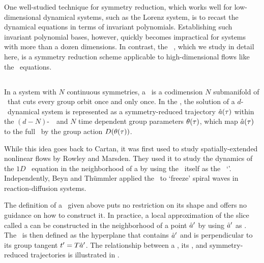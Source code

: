 \documentclass[aip,cha,
reprint,
secnumarabic,
nofootinbib, tightenlines,
nobibnotes, showkeys, showpacs,
superscriptaddress,
]{revtex4-1}
\begin{document}
One well-studied technique for symmetry reduction, which works well for low-dimensional
dynamical systems, such as the Lorenz system, is to recast the dynamical equations in terms 
of invariant polynomials. Establishing such invariant polynomial bases, however, 
quickly becomes impractical for systems with more than a dozen dimensions. In contrast,
the \mslices\ ,
which we study in detail here, is a symmetry reduction scheme applicable to
high-dimensional flows like the \NS\ equations.

\subsection{\Mslices}
\label{s-slice}

In a system with $N$ continuous symmetries, a \emph{\slice} \pSRed\ is a codimension $N$ submanifold
of \pS\ that cuts every group orbit once and only once. In the \emph{\mslices}, the solution
of a $d$-\dmn\ dynamical system is represented as a symmetry-reduced trajectory $\hat{a} (\tau)$ within the
$(d-N)$-\dmn\ \slice\ and $N$ time dependent group parameters $\theta(\tau)$, which
map $\hat{a} (\tau)$ to the full \statesp\ by the group action ${D}(\theta(\tau))$.

While this idea goes back to Cartan,
it was first used to study spatially-extended nonlinear flows by Rowley and Marsden. 
They used it to study the dynamics of
the $1D$ \KS\ equation in the neighborhood of
a \reqv by using the \reqv\ itself as the \slice\ `\template'.
Independently, Beyn and Th\"{u}mmler applied
the \mslices\ to `freeze' spiral waves in reaction-diffusion systems.

The definition of a \slice\ given above puts no restriction on its shape
and offers no guidance on how to construct it. In practice, a
local approximation of the slice called a \emph{\slicePlane} can be constructed
in the neighborhood of a point ${\hat{a}'}$ by using ${\hat{a}'}$ as
\emph{\template}. The \slicePlane\ is then defined as the hyperplane that
contains ${\hat{a}'}$ and is perpendicular to its group tangent $t'_{}
= {T} {\hat{a}'}$. The relationship between a \template, its \slicePlane, and symmetry-reduced trajectories
is illustrated in .
\end{document}
